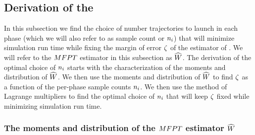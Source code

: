 %
%
%

\subsection{Derivation of the \opteq{}}
\label{sec:opteq_derivation}
In this subsection we find the choice of number trajectories to launch in each  phase (which we will also refer to as sample count or $n_{i}$) that will minimize simulation run time while fixing the margin of error $\zeta$ of the estimator of . We will refer to the $MFPT$ estimator in this subsection as $\widehat{W}$. The derivation of the optimal choice of $n_{i}$ starts with the characterization of the moments and distribution of $\widehat{W}$. We then use the moments and distribution of $\widehat{W}$ to find $\zeta$ as a function of the per-phase sample counts $n_{i}$. We then use the method of Lagrange multipliers to find the optimal choice of $n_{i}$ that will keep $\zeta$ fixed while minimizing simulation run time.


\subsubsection{The moments and distribution of the  $MFPT$ estimator $\widehat{W}$}
\label{sec:phase_weight_moments}


